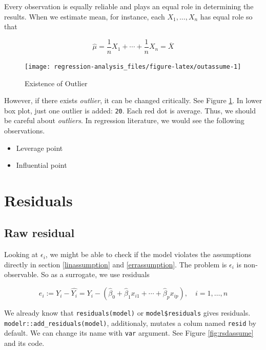 \documentclass[]{book}
\providecommand{\tightlist}{%
  \setlength{\itemsep}{0pt}\setlength{\parskip}{0pt}}
\theoremstyle{definition}
\theoremstyle{definition}
\theoremstyle{definition}
\theoremstyle{remark}
\begin{document}
Every observation is equally reliable and plays an equal role in determining the results. When we estimate mean, for instance, each \(X_1, \ldots, X_n\) has equal role so that

\[\hat\mu = \frac{1}{n} X_1 + \cdots + \frac{1}{n} X_n = \overline{X}\]

\begin{figure}[H]

{\centering \texttt{[image: regression-analysis\_files/figure-latex/outassume-1]} 

}

\caption{Existence of Outlier}\label{fig:outassume}
\end{figure}

However, if there exists \emph{outlier}, it can be changed critically. See Figure \ref{fig:outassume}. In lower box plot, just one outlier is added: \texttt{20}. Each red dot is average. Thus, we should be careful about \emph{outliers}. In regression literature, we would see the following observations.

\begin{itemize}
\tightlist
\item
  Leverage point
\item
  Influential point
\end{itemize}

\hypertarget{residuals-1}{%
\section{Residuals}\label{residuals-1}}

\hypertarget{raw-residual}{%
\subsection{Raw residual}\label{raw-residual}}

Looking at \(\epsilon_i\), we might be able to check if the model violates the assumptions directly in section \ref{linassumption} and \ref{errassumption}. The problem is \(\epsilon_i\) is non-observable. So as a surrogate, we use residuals

\begin{equation}
  e_i := Y_i - \hat{Y_i} = Y_i - (\hat\beta_0 + \hat\beta_1 x_{i1} + \cdots + \hat\beta_p x_{ip}), \quad i = 1, \ldots, n
  \label{eq:residualdef}
\end{equation}

We already know that \texttt{residuals(model)} or \texttt{model\$residuals} gives residuals. \texttt{modelr::add\_residuals(model)}, additionaly, mutates a colum named \texttt{resid} by default. We can change its name with \texttt{var} argument. See Figure \ref{fig:rsdassume} and its code.
\end{document}
